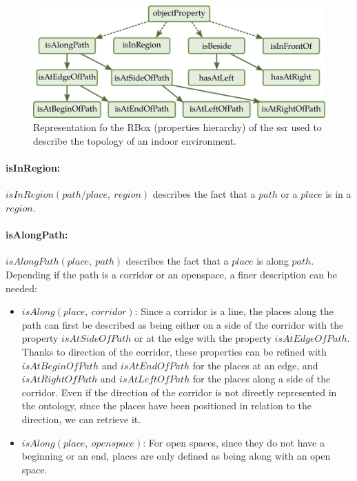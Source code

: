 \begin{figure}[ht!]
\centering
\includegraphics[scale=0.42]{figures/chapter3/ssr_rbox.png}
\caption{\label{fig:chap3_rbox} Representation fo the RBox (properties hierarchy) of the \acrlong{ssr} used to describe the topology of an indoor environment.}
\end{figure}

\paragraph{isInRegion:} $isInRegion(path/place,\ region)$ describes the fact that a $path$ or a $place$ is in a $region$.

\paragraph{isAlongPath:} $isAlongPath(place,\ path)$ describes the fact that a $place$ is along $path$. Depending if the path is a corridor or an openspace, a finer description can be needed:
\begin{itemize}
  
  \item $isAlong(place,\ corridor)$: Since a corridor is a line, the places along the path can first be described as being either on a side of the corridor with the property $isAtSideOfPath$ or at the edge with the property $isAtEdgeOfPath$. Thanks to direction of the corridor, these properties can be refined with $isAtBeginOfPath$ and $isAtEndOfPath$ for the places at an edge, and  $isAtRightOfPath$ and $isAtLeftOfPath$ for the places along a side of the corridor. Even if the direction of the corridor is not directly represented in the ontology, since the places have been positioned in relation to the direction, we can retrieve it.
  \item $isAlong(place,\ openspace)$: For open spaces, since they do not have a beginning or an end, places are only defined as being along with an open space.
\end{itemize}

